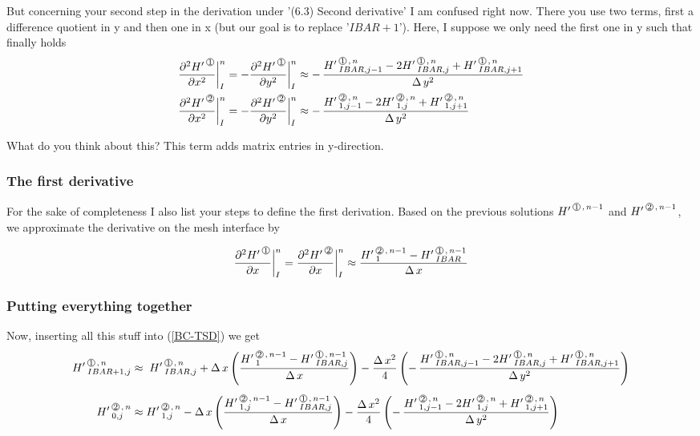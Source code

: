 But concerning your second step in the derivation under '(6.3) Second derivative' I am confused right now. There you use two terms, first a difference quotient in y and then one in x (but our goal is to replace '$IBAR+1$'). Here, I suppose we only need the first one in y such that finally holds
\begin{align}
\label{BC-TSE}
 \frac{\HPNT{1}}{\DXPT} \bigg|_{I}^n  & = -  \frac{\HPNT{1}}{\DYPT}\bigg|_{I}^n   \approx 
                                                                  - \,\frac{\HL{IBAR,j-1}{1}{n} - 2 \HL{IBAR,j}{1}{n} + \HL{IBAR,j+1}{1}{n}}{\DYT}        \\                                                                 
 \frac{\HPNT{2}}{\DXPT} \bigg|_{I}^n  & = -  \frac{\HPNT{2}}{\DYPT}\bigg|_{I}^n   \approx 
                                                                  - \, \frac{\HL{1,j-1}{2}{n} - 2 \HL{1,j}{2}{n} + \HL{1,j+1}{2}{n}}{\DYT} 
\end{align}                                                                  

What do you think about this? This term adds matrix entries in y-direction.

\subsubsection{The first derivative}
For the sake of completeness I also list your steps to define the first derivation. Based on the previous solutions
$\HL{\,}{1}{n-1}$ and $\HL{\,}{2}{n-1}$, we approximate the derivative on the mesh interface by

\[ \frac {\HPNT{1}}{\DXP}\bigg|_{I}^n  = \frac {\HPNT{2}}{\DXP}\bigg|_{I}^n \approx \frac{\HL{1}{2}{n-1} - \HL{IBAR}{1}{n-1}} {\DX}\]

\subsubsection{Putting everything together}

Now, inserting all this stuff into (\ref{BC-TSD}) we get
\begin{align}
\label{BC-TSF}
\HL{IBAR+1,j}{1}{n} & \approx \;  \HL{IBAR,j}{1}{n}  + \DX \left( \frac{\HL{1}{2}{n-1} - \HL{IBAR,j}{1}{n-1}} {\DX}\right)
                                                      - \frac{\DXT}{4}   \left(-\,\frac{\HL{IBAR,j-1}{1}{n} - 2 \HL{IBAR,j}{1}{n} + \HL{IBAR,j+1}{1}{n}}{\DYT} \right)
 \\[1ex]
\HL{0,j}{2}{n} & \approx  \HL{1,j}{2}{n}  - \DX \left(\frac{\HL{1,j}{2}{n-1} - \HL{IBAR,j}{1}{n-1}} {\DX}\right)
                                                - \frac{\DXT}{4} \left(-\,\frac{\HL{1,j-1}{2}{n} - 2 \HL{1,j}{2}{n} + \HL{1,j+1}{2}{n}}{\DYT}  \right)    \nonumber                                           
\end{align}

